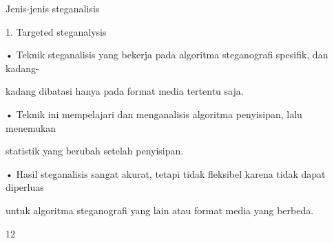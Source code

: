 \documentclass{article}
\begin{document}

Jenis-jenis steganalisis

1. Targeted steganalysis

• Teknik steganalisis yang bekerja pada algoritma steganografi spesifik, dan kadang-

kadang dibatasi hanya pada format media tertentu saja.

• Teknik ini mempelajari dan menganalisis algoritma penyisipan, lalu menemukan 

statistik yang berubah setelah penyisipan. 

• Hasil steganalisis sangat akurat, tetapi tidak fleksibel karena tidak dapat diperluas 

untuk algoritma steganografi yang lain atau format media yang berbeda.

12
\end{document}
